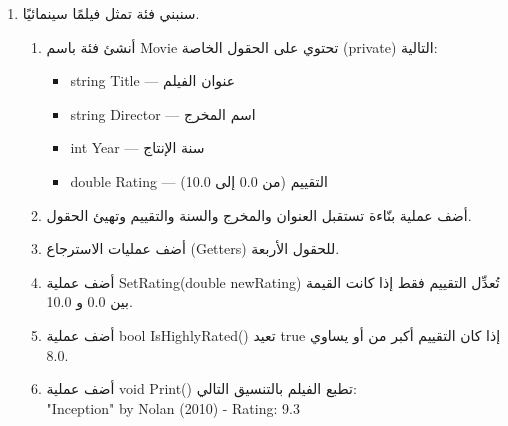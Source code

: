 \documentclass[14pt]{extarticle}
\begin{document}
\begin{enumerate}[itemsep=2em]
\begin{boxSolution}
\begin{english}
\begin{verbatim}
// In Main: (g)
Student s1 = new Student("Sara", 10, 91.5);
Student s2 = new Student("Khalil", 11, 85.0);

s1.Print();
s2.Print();

s2.SetAverage(52.0);
Console.WriteLine("Is Khalil passing? " + s2.IsPassing());
\end{verbatim}
\end{english}
\end{boxSolution}
\fi
\clearpage

\item
سنبني فئة تمثل فيلمًا سينمائيًا.
\begin{enumerate}[itemsep=1em]
    \item أنشئ فئة باسم \textenglish{Movie} تحتوي على الحقول الخاصة (\textenglish{private}) التالية:
    \begin{itemize}[itemsep=1pt]
        \item \textenglish{string Title} — عنوان الفيلم
        \item \textenglish{string Director} — اسم المخرج
        \item \textenglish{int Year} — سنة الإنتاج
        \item \textenglish{double Rating} — التقييم (من 0.0 إلى 10.0)
    \end{itemize}

    \item أضف عملية بنّاءة تستقبل العنوان والمخرج والسنة والتقييم وتهيئ الحقول.

    \item أضف عمليات الاسترجاع (\textenglish{Getters}) للحقول الأربعة.

    \item أضف عملية \textenglish{SetRating(double newRating)} تُعدِّل التقييم فقط إذا كانت القيمة بين \textenglish{0.0} و \textenglish{10.0}.

    \item أضف عملية \textenglish{bool IsHighlyRated()} تعيد \textenglish{true} إذا كان التقييم أكبر من أو يساوي \textenglish{8.0}.

    \item أضف عملية \textenglish{void Print()} تطبع الفيلم بالتنسيق التالي: \\
    \textenglish{"Inception" by Nolan (2010) - Rating: 9.3}


\end{enumerate}
\end{enumerate}
\end{document}
